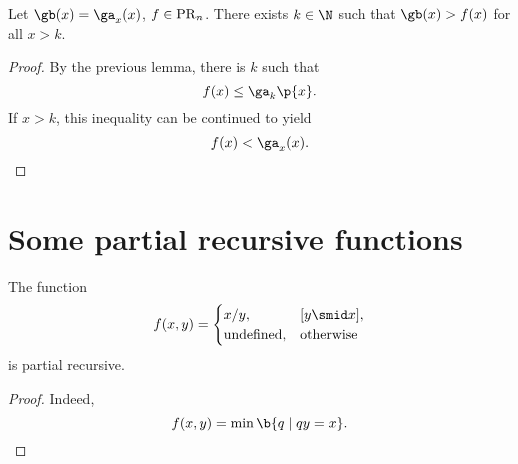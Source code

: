 \begin{theorem}
  Let $\gb(x) = \ga_x(x)$, $f \in \operatorname{PR}_n$. There exists $k \in \N$ such that $\gb(x) > f(x)$ for all $x > k$.
\end{theorem}

\begin{proof}
  By the previous lemma, there is $k$ such that
  $$ f(x) \le \ga_k\p{x}. $$
  If $x > k$, this inequality can be continued to yield
  $$ f(x) < \ga_x(x). $$
\end{proof}

\section{Some partial recursive functions}

\newcommand{\und}[0]{\text{undefined}}
\newcommand{\oth}[0]{\text{otherwise}}

\begin{lemma}
  The function
  $$
  f(x, y) =
  \begin{cases}
    x/y, & [y \smid x], \\
    \und, & \oth
  \end{cases}
  $$
  is partial recursive.
\end{lemma}

\begin{proof}
  Indeed,
  $$ f(x, y) = \min\b{ q \mid qy = x }. $$
\end{proof}
